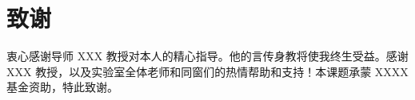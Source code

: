 \chapter*{致\quad 谢}
衷心感谢导师 XXX 教授对本人的精心指导。他的言传身教将使我终生受益。感谢 XXX
教授，以及实验室全体老师和同窗们的热情帮助和支持！本课题承蒙 XXXX 基金资助，特此致谢。
